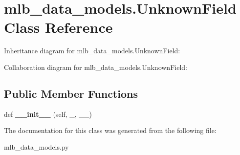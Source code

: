 \hypertarget{classmlb__data__models_1_1UnknownField}{}\section{mlb\+\_\+data\+\_\+models.\+Unknown\+Field Class Reference}
\label{classmlb__data__models_1_1UnknownField}


Inheritance diagram for mlb\+\_\+data\+\_\+models.\+Unknown\+Field\+:


Collaboration diagram for mlb\+\_\+data\+\_\+models.\+Unknown\+Field\+:
\subsection*{Public Member Functions}
\begin{DoxyCompactItemize}
\item 
def {\bfseries \+\_\+\+\_\+init\+\_\+\+\_\+} (self, \+\_\+, \+\_\+\+\_\+)\hypertarget{classmlb__data__models_1_1UnknownField_ac522ebf0e2a569e420052a2f1105c270}{}\label{classmlb__data__models_1_1UnknownField_ac522ebf0e2a569e420052a2f1105c270}

\end{DoxyCompactItemize}


The documentation for this class was generated from the following file\+:\begin{DoxyCompactItemize}
\item 
mlb\+\_\+data\+\_\+models.\+py\end{DoxyCompactItemize}
